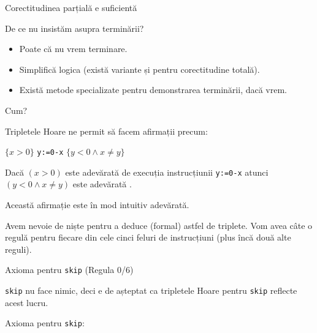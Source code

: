 \begin{frame}{Corectitudinea parțială e suficientă}

\alert{De ce nu insistăm asupra terminării?}
\begin{itemize}
	\item Poate că nu vrem terminare.
	\item Simplifică logica (există variante și pentru corectitudine totală).
	\item Există metode specializate pentru demonstrarea terminării, dacă vrem.
\end{itemize}

\end{frame}


\begin{frame}{Cum?}

\vspace{-.6cm}
\begin{example}
\smallskip
Tripletele Hoare ne permit să facem afirmații precum:
\vspace{-.2cm}
\begin{center}
$\{x>0\}$ \texttt{y:=0-x} $\{y < 0 \wedge x \neq y\}$
\end{center}
\pause
Dacă $(x > 0)$ este adevărată  de execuția instrucțiunii \texttt{y:=0-x}
atunci $(y < 0 \wedge x \neq y)$ este adevărată .

\pause
Această afirmație este în mod intuitiv adevărată.
\end{example}

\medskip \pause

Avem nevoie de niște  pentru a deduce (formal) astfel de triplete.
Vom avea câte o regulă pentru fiecare din cele cinci feluri de instrucțiuni (plus încă două alte reguli).
\end{frame}


\begin{frame}{Axioma pentru \texttt{skip} (Regula 0/6)}

\texttt{skip} nu face nimic, deci e de așteptat ca tripletele Hoare pentru \texttt{skip} reflecte acest lucru.

\medskip
\alert{Axioma pentru \texttt{skip}:}
\begin{center}
\end{center}

\end{frame}



